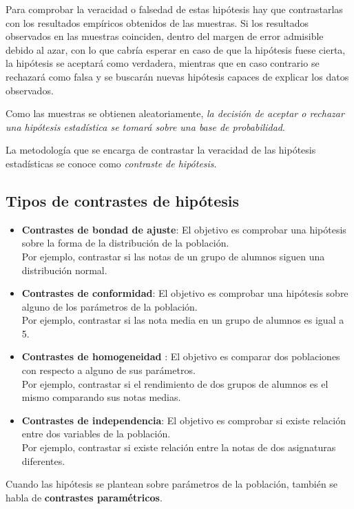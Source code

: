 \documentclass[
  a4paper,
]{scrreport}
\theoremstyle{plain}
\theoremstyle{definition}
\theoremstyle{definition}
\theoremstyle{remark}
\begin{document}
Para comprobar la veracidad o falsedad de estas hipótesis hay que
contrastarlas con los resultados empíricos obtenidos de las muestras. Si
los resultados observados en las muestras coinciden, dentro del margen
de error admisible debido al azar, con lo que cabría esperar en caso de
que la hipótesis fuese cierta, la hipótesis se aceptará como verdadera,
mientras que en caso contrario se rechazará como falsa y se buscarán
nuevas hipótesis capaces de explicar los datos observados.

Como las muestras se obtienen aleatoriamente, \emph{la decisión de
aceptar o rechazar una hipótesis estadística se tomará sobre una base de
probabilidad}.

La metodología que se encarga de contrastar la veracidad de las
hipótesis estadísticas se conoce como \emph{contraste de hipótesis}.

\subsection{Tipos de contrastes de
hipótesis}\label{tipos-de-contrastes-de-hipuxf3tesis}

\begin{itemize}
\item
  \textbf{Contrastes de bondad de ajuste}: El objetivo es comprobar una
  hipótesis sobre la forma de la distribución de la población.\\
  Por ejemplo, contrastar si las notas de un grupo de alumnos siguen una
  distribución normal.
\item
  \textbf{Contrastes de conformidad}: El objetivo es comprobar una
  hipótesis sobre alguno de los parámetros de la población.\\
  Por ejemplo, contrastar si las nota media en un grupo de alumnos es
  igual a 5.
\item
  \textbf{Contrastes de homogeneidad} : El objetivo es comparar dos
  poblaciones con respecto a alguno de sus parámetros.\\
  Por ejemplo, contrastar si el rendimiento de dos grupos de alumnos es
  el mismo comparando sus notas medias.
\item
  \textbf{Contrastes de independencia}: El objetivo es comprobar si
  existe relación entre dos variables de la población.\\
  Por ejemplo, contrastar si existe relación entre la notas de dos
  asignaturas diferentes.
\end{itemize}

Cuando las hipótesis se plantean sobre parámetros de la población,
también se habla de \textbf{contrastes paramétricos}.
\end{document}
